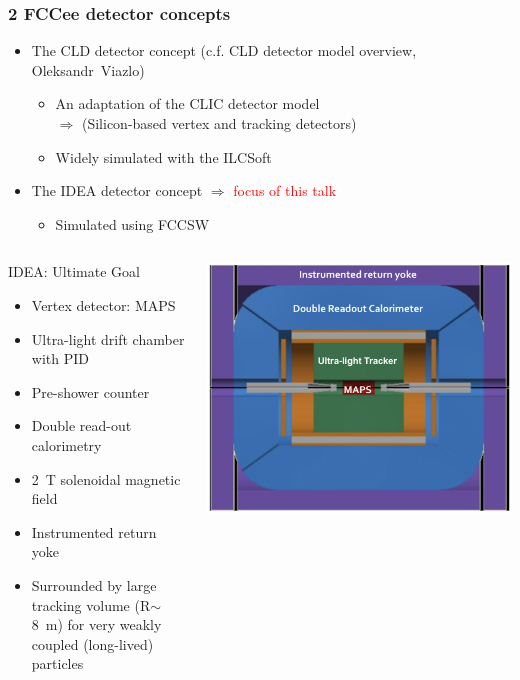 \documentclass[hyperref={colorlinks=true,pdfpagelabels=false,linkcolor=black}, xcolor=dvipsnames,10pt]{beamer}
\begin{document}
\begin{frame}
	\frametitle{2 FCCee detector concepts}
	
		\begin{itemize}
		\item The CLD detector concept (c.f. CLD detector model overview, Oleksandr~Viazlo)
			\begin{itemize}
			\item An adaptation of the CLIC detector model 
			\\ $\Rightarrow$ (Silicon-based vertex and tracking detectors)
			\item Widely simulated with the ILCSoft
			\end{itemize}
		\item The IDEA detector concept $\Rightarrow$ \textcolor{Red}{focus of this talk}
			\begin{itemize}
			\item Simulated using FCCSW
			\end{itemize}
		\end{itemize}

	
	\begin{columns}
	
	\begin{block}{IDEA: Ultimate Goal}
	\begin{itemize}
	\item Vertex detector: MAPS
	\item Ultra-light drift chamber with PID
	\item Pre-shower counter
	\item Double read-out calorimetry
	\item 2~T solenoidal magnetic field
	\item Instrumented return yoke
	\item Surrounded by large tracking volume (R$\sim$8~m) for very weakly coupled (long-lived) particles
	\end{itemize}
	\end{block}
	\centering
	\includegraphics[width=\textwidth]{../figures/FCCeeIDEAConcept.png}
	\end{columns}


\end{frame}
\end{document}

